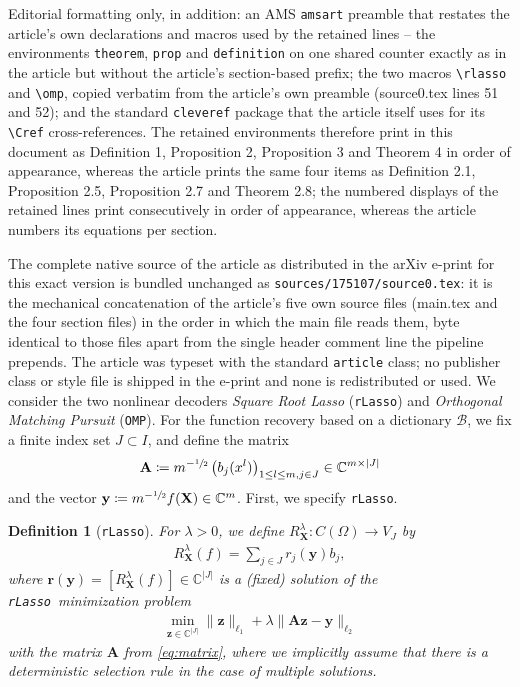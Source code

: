 \documentclass[10pt,a4paper]{amsart}
\newtheorem{definition}[theorem]{Definition}
\newcommand{\rlasso}{\texttt{rLasso}}
\newcommand{\omp}{\texttt{OMP}}
\begin{document}
Editorial formatting only, in addition: an AMS \texttt{amsart} preamble that restates the article's own declarations and macros used by the retained lines -- the environments \texttt{theorem}, \texttt{prop} and \texttt{definition} on one shared counter exactly as in the article but without the article's section-based prefix; the two macros \texttt{\textbackslash rlasso} and \texttt{\textbackslash omp}, copied verbatim from the article's own preamble (source0.tex lines 51 and 52); and the standard \texttt{cleveref} package that the article itself uses for its \texttt{\textbackslash Cref} cross-references. The retained environments therefore print in this document as Definition 1, Proposition 2, Proposition 3 and Theorem 4 in order of appearance, whereas the article prints the same four items as Definition 2.1, Proposition 2.5, Proposition 2.7 and Theorem 2.8; the numbered displays of the retained lines print consecutively in order of appearance, whereas the article numbers its equations per section.

The complete native source of the article as distributed in the arXiv e-print for this exact version is bundled unchanged as \texttt{sources/175107/source0.tex}: it is the mechanical concatenation of the article's five own source files (main.tex and the four section files) in the order in which the main file reads them, byte identical to those files apart from the single header comment line the pipeline prepends. The article was typeset with the standard \texttt{article} class; no publisher class or style file is shipped in the e-print and none is redistributed or used.
We consider the two nonlinear decoders \emph{Square Root Lasso} (\rlasso) and \emph{Orthogonal Matching Pursuit} (\omp).
For the function recovery based on a dictionary $\mathcal{B}$, we fix a finite index set $J\subset I$, and define the matrix
\begin{gather}\label{eq:matrix}
	\mathbf{A} \coloneqq m^{-\sfrac{1}{2}}\left(b_j(x^l)\right)_{1 \leq l \leq m, j \in J} \in \mathbb{C}^{m\times \lvert J\rvert}
\end{gather}
and the vector $\mathbf{y} \coloneqq m^{-\sfrac{1}{2}} f(\mathbf{X}) \in \mathbb{C}^m$.
First, we specify \rlasso.

\begin{definition}[\rlasso]\label{def:square_root_lasso}
For $\lambda>0$, we define $R_{\mathbf{X}}^\lambda\colon C(\Omega) \to V_J$ by
\begin{gather}\label{eq:Lasso_Decoder}
	R_{\mathbf{X}}^\lambda(f) = \sum_{j \in J} r_j(\mathbf{y}) b_j,
\end{gather}
where $\mathbf{r}(\mathbf{y}) = [R_{\mathbf{X}}^\lambda(f)] \in \mathbb{C}^{\lvert J\rvert}$ is a (fixed) solution of the \rlasso \ minimization problem
\begin{gather}\label{eq:MinimizationProblem}
	\min_{\mathbf{z} \in \mathbb{C}^{\lvert J\rvert}} \lVert\mathbf{z}\rVert_{\ell_1} + \lambda \lVert\mathbf{A} \mathbf{z} - \mathbf{y}\rVert_{\ell_2}
\end{gather}
with the matrix $\mathbf{A}$ from \eqref{eq:matrix}, where we implicitly assume that there is a deterministic selection rule in the case of multiple solutions.
\end{definition}
\end{document}
